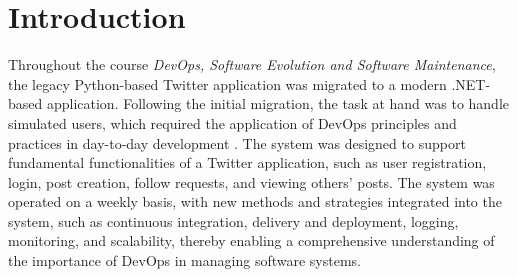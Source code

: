 \chapter{Introduction}

Throughout the course \textit{DevOps, Software Evolution and Software Maintenance}, the legacy Python-based Twitter application was migrated to a modern .NET-based application. Following the initial migration, the task at hand was to handle simulated users, which required the application of DevOps principles and practices in day-to-day development \cite{kim2016devops}. The system was designed to support fundamental functionalities of a Twitter application, such as user registration, login, post creation, follow requests, and viewing others' posts. The system was operated on a weekly basis, with new methods and strategies integrated into the system, such as continuous integration, delivery and deployment, logging, monitoring, and scalability, thereby enabling a comprehensive understanding of the importance of DevOps in managing software systems.
